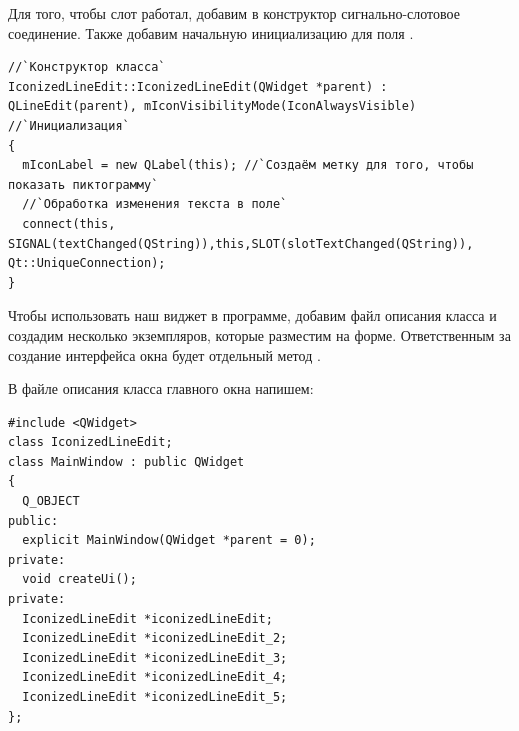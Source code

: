 Для того, чтобы слот  работал, добавим в конструктор сигнально-слотовое соединение.
Также добавим начальную инициализацию для поля .
\begin{lstlisting}
//`Конструктор класса`
IconizedLineEdit::IconizedLineEdit(QWidget *parent) : QLineEdit(parent), mIconVisibilityMode(IconAlwaysVisible) //`Инициализация`
{
  mIconLabel = new QLabel(this); //`Создаём метку для того, чтобы показать пиктограмму`
  //`Обработка изменения текста в поле`
  connect(this, SIGNAL(textChanged(QString)),this,SLOT(slotTextChanged(QString)), Qt::UniqueConnection);
}
\end{lstlisting}

Чтобы использовать наш виджет в программе, добавим файл описания класса и создадим несколько экземпляров, которые
разместим на форме. Ответственным за создание интерфейса окна будет отдельный метод .

В файле описания класса главного окна напишем:
\begin{lstlisting} 
#include <QWidget>
class IconizedLineEdit;
class MainWindow : public QWidget
{
  Q_OBJECT
public:
  explicit MainWindow(QWidget *parent = 0);
private:
  void createUi();
private:
  IconizedLineEdit *iconizedLineEdit;
  IconizedLineEdit *iconizedLineEdit_2;
  IconizedLineEdit *iconizedLineEdit_3;
  IconizedLineEdit *iconizedLineEdit_4;
  IconizedLineEdit *iconizedLineEdit_5;
};
\end{lstlisting}


